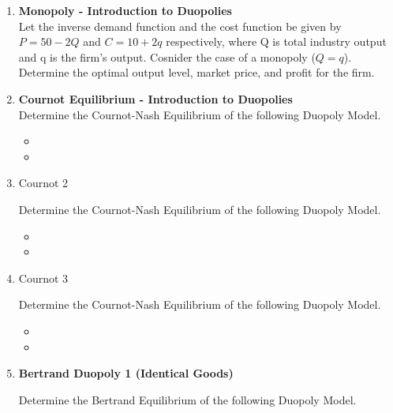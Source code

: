\documentclass[]{report}
\begin{document}
\begin{enumerate}
\item \textbf{Monopoly - Introduction to Duopolies}\\%
Let the inverse demand function and the cost function be given by
$P = 50 − 2Q$ and $C = 10 + 2q$
respectively, where Q is total industry output and q is the firm’s output. 
Cosnider the case of a monopoly ($Q=q$). Determine the optimal output level, market price, and profit for the firm.
\item \textbf{Cournot Equilibrium - Introduction to Duopolies}\\%


Determine the Cournot-Nash Equilibrium of the following Duopoly Model.

\begin{itemize}
	
	\item
	
	\item
	
\end{itemize}

\item Cournot 2


Determine the Cournot-Nash Equilibrium of the following Duopoly Model.

\begin{itemize}
	
	\item
	
	\item
	
\end{itemize}
\item Cournot 3

Determine the Cournot-Nash Equilibrium of the following Duopoly Model.

\begin{itemize}
	
	\item
	
	\item
	
\end{itemize}

\item \textbf{Bertrand Duopoly 1 (Identical Goods)}


Determine the Bertrand Equilibrium of the following Duopoly Model.


\end{enumerate}
\end{document}
